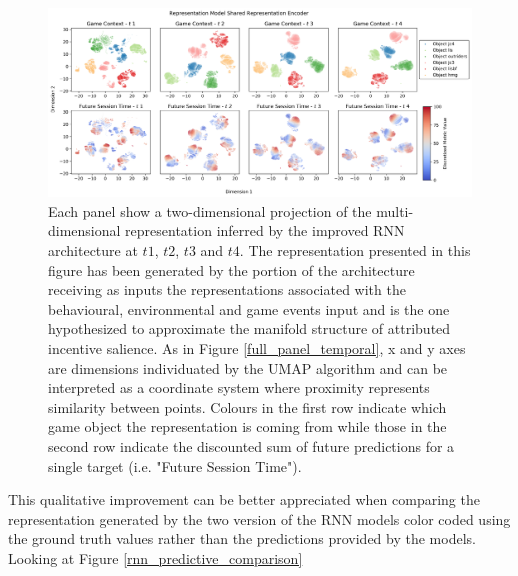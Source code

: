 \begin{figure}[ht]
\centering
\includegraphics[width=\textwidth]{images/chapter_4/RNN_env_even_0_lstm_layer_shared_Future Session Time.png}
\caption[\textbf{Lower dimensional representation of the shared latent representations generated by the improved version of the RNN architecture}]{Each panel show a two-dimensional projection of the multi-dimensional representation inferred by the improved RNN architecture at $t1$, $t2$, $t3$ and $t4$. The representation presented in this figure has been generated by the portion of the architecture receiving as inputs the representations associated with the behavioural, environmental and game events input and is the one hypothesized to approximate the manifold structure of attributed incentive salience. As in Figure \ref{full_panel_temporal}, x and y axes are dimensions individuated by the UMAP algorithm and can be interpreted as a coordinate system where proximity represents similarity between points. Colours in the first row indicate which game object the representation is coming from while those in the second row indicate the discounted sum of future predictions for a single target (i.e. "Future Session Time").}
\label{rnn_env_even_full_shared}
\end{figure}

This qualitative improvement can be better appreciated when comparing the representation generated by the two version of the RNN models color coded using the ground truth values rather than the predictions provided by the models. Looking at Figure \ref{rnn_predictive_comparison}

